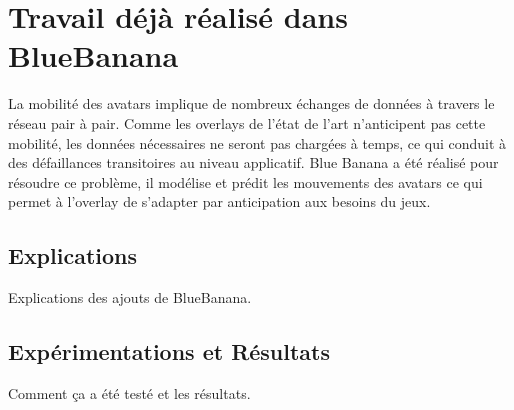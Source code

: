 \section{Travail déjà réalisé dans BlueBanana}
	\label{BlueBanana}
	La mobilité des avatars implique de nombreux échanges de données à travers le réseau pair à pair. Comme les overlays de l'état de l'art n'anticipent pas cette mobilité, les données nécessaires ne seront pas chargées à temps, ce qui conduit à des défaillances transitoires au niveau applicatif. Blue Banana a été réalisé pour résoudre ce problème, il modélise et prédit les mouvements des avatars ce qui permet à l'overlay de s'adapter par anticipation aux besoins du jeux.
	\subsection{Explications}
		Explications des ajouts de BlueBanana.\\ \newline
	\subsection{Expérimentations et Résultats}
		Comment ça a été testé et les résultats.
